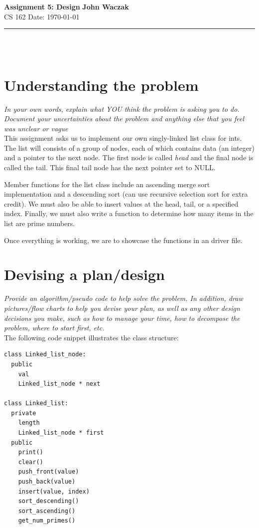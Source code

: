 \documentclass[a4paper, 11pt]{article}
\begin{document}
\noindent
\large\textbf{Assignment 5: Design} \hfill \textbf{John Waczak} \\
\normalsize CS 162 \hfill  Date: \today 
\par\noindent\rule{\textwidth}{0.4pt} \\\\



\section*{Understanding the problem}

\textit{In your own words, explain what YOU think the problem is asking you to
  do.  Document your uncertainties about the problem and anything else that you
  feel was unclear or vague}\\

This assignment asks us to implement our own singly-linked list class for ints.
The list will consists of a group of nodes, each of which contains data (an
integer) and a pointer to the next node. The first node is called \textit{head}
and the final node is called the tail. This final tail node has the next pointer
set to NULL.

Member functions for the list class include an ascending merge sort
implementation and a descending sort (can use recursive selection sort for extra
credit). We must also be able to insert values at the head, tail, or a specified
index. Finally, we must also write a function to determine how many items in the
list are prime numbers.


Once everything is working, we are to showcase the functions in an driver file. 


 
\section*{Devising a plan/design}

\textit{Provide an algorithm/pseudo code to help solve the problem. In addition,
  draw pictures/flow charts to help you devise your plan, as well as any other
  design decisions you make, such as how to manage your time, how to decompose
  the problem, where to start first, etc. }\\ 

\noindent The following code snippet illustrates the class structure:
\begin{lstlisting}
class Linked_list_node:
  public
    val
    Linked_list_node * next

class Linked_list:
  private
    length
    Linked_list_node * first
  public
    print()
    clear()
    push_front(value)
    push_back(value)
    insert(value, index)
    sort_descending()
    sort_ascending()
    get_num_primes()
\end{lstlisting}
\end{document}
